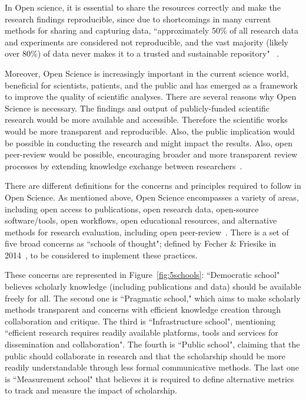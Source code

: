 In Open science, it is essential to share the resources correctly and make the research findings reproducible, since due to shortcomings in many current methods for sharing and capturing data, ``approximately 50\% of all research data and experiments are considered not reproducible, and the vast majority (likely over 80\%) of data never makes it to a trusted and sustainable repository" ~\cite{ayris2016realising}.

Moreover, Open Science is increasingly important in the current science world, beneficial for scientists, patients, and the public and has emerged as a framework to improve the quality of scientific analyses. There are several reasons why Open Science is necessary. The findings and output of publicly-funded scientific research would be more available and accessible. Therefore the scientific works would be more transparent and reproducible. Also, the public implication would be possible in conducting the research and might impact the results. Also, open peer-review would be possible, encouraging broader and more transparent review processes by extending knowledge exchange between researchers~\cite{wolfram2020open,ross2019guidelines}. 


There are different definitions for the concerns and principles required to follow in Open Science. As mentioned above, Open Science encompasses a variety of areas, including open access to publications, open research data, open-source software/tools, open workflows, open educational resources, and alternative methods for research evaluation, including open peer-review~\cite{pontika2015fostering}. There is a set of five broad concerns as ``schools of thought"; defined by Fecher \& Friesike in 2014~\cite{fecher2014open}, to be considered to implement these practices.

These concerns are represented in Figure~\ref{fig:5schools}: ``Democratic school" believes scholarly knowledge (including publications and data) should be available freely for all. The second one is ``Pragmatic school," which aims to make scholarly methods transparent and concerns with efficient knowledge creation through collaboration and critique. The third is ``Infrastructure school", mentioning ``efficient research requires readily available platforms, tools and services for dissemination and collaboration"\cite{open_science}. The fourth is ``Public school", claiming that the public should collaborate in research and that the scholarship should be more readily understandable through less formal communicative methods. The last one is ``Measurement school" that believes it is required to define alternative metrics to track and measure the impact of scholarship.

